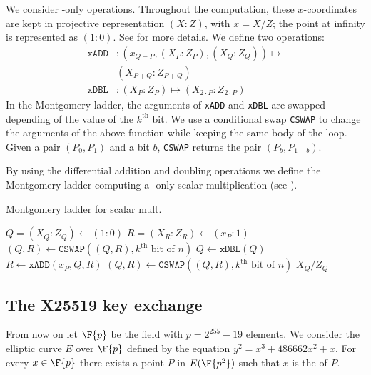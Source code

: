 We consider \xcoord-only operations. Throughout the computation,
these $x$-coordinates are kept in projective representation
$(X : Z)$, with $x = X/Z$; the point at infinity is represented as $(1:0)$.
See  for more details.
We define two operations:
\begin{align*}
  \texttt{xADD} &: (x_{Q-P}, (X_P:Z_P), (X_Q:Z_Q)) \mapsto \\
&(X_{P + Q}:Z_{P + Q})\\
\texttt{xDBL} &: (X_P:Z_P) \mapsto (X_{2 \cdot P}:Z_{2 \cdot P})
\end{align*}
In the Montgomery ladder, %
the arguments of \texttt{xADD} and \texttt{xDBL}
are swapped depending of the value of the $k^{\text{th}}$ bit. We use a conditional
swap \texttt{CSWAP} to change the arguments of the above function while keeping
the same body of the loop.
Given a pair $(P_0, P_1)$ and a bit $b$, \texttt{CSWAP} returns the pair
$(P_b, P_{1-b})$.

By using the differential addition and doubling operations we define the Montgomery ladder
computing a \xcoord-only scalar multiplication (see ).
\begin{algorithm}
\caption{Montgomery ladder for scalar mult.}
\label{alg:montgomery-ladder}
\begin{algorithmic}
  \STATE $Q = (X_Q:Z_Q) \leftarrow (1:0)$
  \STATE $R = (X_R:Z_R) \leftarrow (x_P:1)$
    \STATE $(Q,R) \leftarrow \texttt{CSWAP}((Q,R), k^{\text{th}}\text{ bit of }n)$
    \STATE $Q \leftarrow \texttt{xDBL}(Q)$
    \STATE $R \leftarrow \texttt{xADD}(x_P,Q,R)$
    \STATE $(Q,R) \leftarrow \texttt{CSWAP}((Q,R), k^{\text{th}}\text{ bit of }n)$
  \ENDFOR
  \RETURN $X_Q/Z_Q$
\end{algorithmic}
\end{algorithm}



\subsection{The X25519 key exchange}
\label{subsec:X25519-key-exchange}

From now on let $\F{p}$ be the field with $p=2^{255}-19$ elements.
We consider the elliptic curve $E$ over $\F{p}$ defined by the
equation $y^2 = x^3 + 486662 x^2 + x$.
For every $x \in \F{p}$ there exists a point $P$ in $E(\F{p^2})$
such that $x$ is the \xcoord of $P$.

